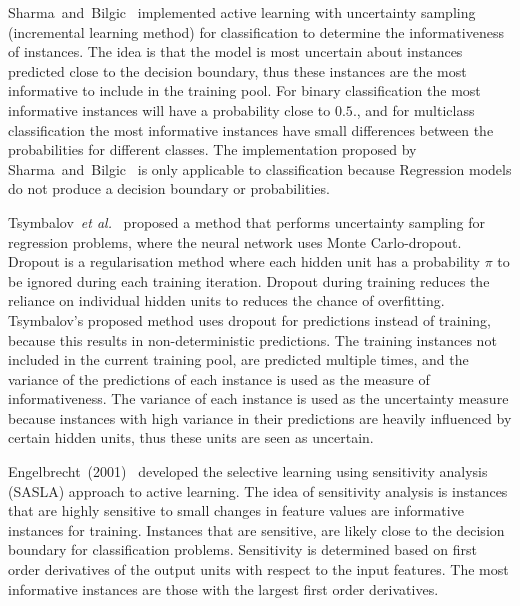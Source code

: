\documentclass[conference]{IEEEtran}
\begin{document}
	Sharma~and~Bilgic~\cite{alus} implemented active learning with uncertainty sampling (incremental learning method) for classification to determine the informativeness of instances. The idea is that the model is most uncertain about instances predicted close to the decision boundary, thus these instances are the most informative to include in the training pool. For binary classification the most informative instances will have a probability close to $0.5$., and for multiclass classification the most informative instances have small differences between the probabilities for different classes. The implementation proposed by Sharma~and~Bilgic~\cite{alus} is only applicable to classification because Regression models do not produce a decision boundary or probabilities. 
	
	Tsymbalov~\textsl{et al.}~\cite{dropoutsasla} proposed a method that performs uncertainty sampling for regression problems, where the neural network uses Monte Carlo-dropout. Dropout is a regularisation method where each hidden unit has a probability $\pi$ to be ignored during each training iteration. Dropout during training reduces the reliance on individual hidden units to reduces the chance of overfitting. Tsymbalov's proposed method uses dropout for predictions instead of training, because this results in non-deterministic predictions. The training instances not included in the current training pool, are predicted multiple times, and the variance of the predictions of each instance is used as the measure of informativeness. The variance of each instance is used as the uncertainty measure because instances with high variance in their predictions are heavily influenced by certain hidden units, thus these units are seen as uncertain.
	
	Engelbrecht~(2001)~\cite{sasla} developed the selective learning using sensitivity analysis (SASLA) approach to active learning. The idea of sensitivity analysis is instances that are highly sensitive to small changes in feature values are informative instances for training. Instances that are sensitive, are likely close to the decision boundary for classification problems. Sensitivity is determined based on first order derivatives of the output units with respect to the input features. The most informative  instances are those with the largest first order derivatives.
	
\end{document}
